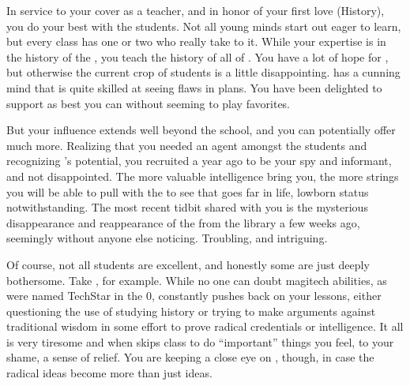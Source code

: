 \documentclass[char]{GL2020}
\begin{document}
In service to your cover as a teacher, and in honor of your first love (History), you do your best with the students. Not all young minds start out eager to learn, but every class has one or two who really take to it. While your expertise is in the history of the \pFarm{}, you teach the history of all of \pEarth{}. You have a lot of hope for \cLibAssist{\full}, but otherwise the current crop of students is a little disappointing. \cLibAssist{} has a cunning mind that is quite skilled at seeing flaws in plans. You have been delighted to support \cLibAssist{\them} as best you can without seeming to play favorites. 

But your influence extends well beyond the school, and you can potentially offer \cLibAssist{} much more. Realizing that you needed an agent amongst the students and recognizing \cLibAssist{}'s potential, you recruited \cLibAssist{\them} a year ago to be your spy and informant, and \cLibAssist{\they} \cLibAssist{\have} not disappointed. The more valuable intelligence \cLibAssist{\they} bring\cLibAssist{\verbs} you, the more strings you will be able to pull with the \cQueen{\Monarch} to see that \cLibAssist{} goes far in life, \cLibAssist{\their} lowborn status notwithstanding. The most recent tidbit \cLibAssist{\they} shared with you is the mysterious disappearance and reappearance of the \iScythe{} from the library a few weeks ago, seemingly without anyone else noticing. Troubling, and intriguing.

Of course, not all students are excellent, and honestly some are just deeply bothersome. Take \cTechStar{\full}, for example. While no one can doubt \cTechStar{\their} magitech abilities, as \cTechStar{\they} were named TechStar in the 0\pTech{}, \cTechStar{\they} constantly pushes back on your lessons, either questioning the use of studying history or trying to make arguments against traditional wisdom in some effort to prove \cTechStar{\their} radical credentials or intelligence. It all is very tiresome and when \cTechStar{\they} skips class to do “important” things you feel, to your shame, a sense of relief. You are keeping a close eye on \cTechStar{\them}, though, in case the radical ideas become more than just ideas.
\end{document}
